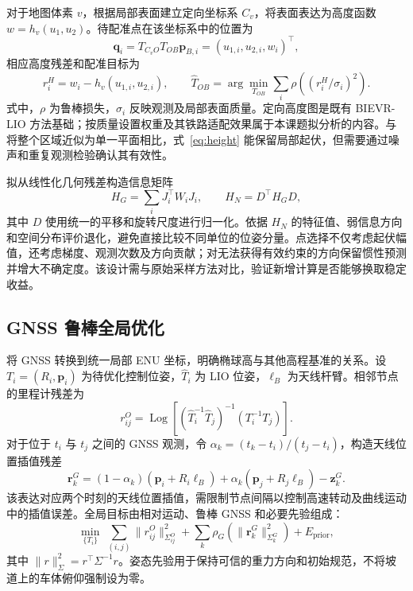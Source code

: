 \documentclass[UTF8,a4paper,12pt,fontset=fandol]{ctexart}
\newcommand{\vect}[1]{\bm{#1}}
\DeclareMathOperator{\Log}{Log}
\begin{document}
对于地图体素 \(v\)，根据局部表面建立定向坐标系 \(C_v\)，将表面表达为高度函数 \(w=h_v(u_1,u_2)\)。待配准点在该坐标系中的位置为
\begin{equation}
  \vect{q}_i=T_{C_vO}T_{OB}\vect{p}_{B,i}
  =\left(u_{1,i},u_{2,i},w_i\right)^\top ,
\end{equation}
相应高度残差和配准目标为
\begin{equation}
  r_i^H=w_i-h_v(u_{1,i},u_{2,i}),\qquad
  \widehat T_{OB}=\arg\min_{T_{OB}}
  \sum_i \rho\!\left((r_i^H/\sigma_i)^2\right).
  \label{eq:height}
\end{equation}
式中，\(\rho\) 为鲁棒损失，\(\sigma_i\) 反映观测及局部表面质量。定向高度图是既有 BIEVR-LIO 方法基础；按质量设置权重及其铁路适配效果属于本课题拟分析的内容。与将整个区域近似为单一平面相比，式~\eqref{eq:height} 能保留局部起伏，但需要通过噪声和重复观测检验确认其有效性。

拟从线性化几何残差构造信息矩阵
\begin{equation}
  H_G=\sum_i J_i^\top W_iJ_i,\qquad
  H_N=D^\top H_GD,
  \label{eq:information}
\end{equation}
其中 \(D\) 使用统一的平移和旋转尺度进行归一化。依据 \(H_N\) 的特征值、弱信息方向和空间分布评价退化，避免直接比较不同单位的位姿分量。点选择不仅考虑起伏幅值，还考虑梯度、观测次数及方向贡献；对无法获得有效约束的方向保留惯性预测并增大不确定度。该设计需与原始采样方法对比，验证新增计算是否能够换取稳定收益。

\subsection{GNSS 鲁棒全局优化}

将 GNSS 转换到统一局部 ENU 坐标，明确椭球高与其他高程基准的关系。设 \(T_i=(R_i,\vect{p}_i)\) 为待优化控制位姿，\(\widehat T_i\) 为 LIO 位姿，\(\vect{\ell}_B\) 为天线杆臂。相邻节点的里程计残差为
\begin{equation}
 r_{ij}^{O}=\Log\!\left[
  (\widehat T_i^{-1}\widehat T_j)^{-1}(T_i^{-1}T_j)
 \right].
\end{equation}
对于位于 \(t_i\) 与 \(t_j\) 之间的 GNSS 观测，令
\(\alpha_k=(t_k-t_i)/(t_j-t_i)\)，构造天线位置插值残差
\begin{equation}
 \vect{r}_k^{G}=
 (1-\alpha_k)(\vect{p}_i+R_i\vect{\ell}_B)
 +\alpha_k(\vect{p}_j+R_j\vect{\ell}_B)
 -\vect{z}_k^{G}.
 \label{eq:gnss}
\end{equation}
该表达对应两个时刻的天线位置插值，需限制节点间隔以控制高速转动及曲线运动中的插值误差。全局目标由相对运动、鲁棒 GNSS 和必要先验组成：
\begin{equation}
 \min_{\{T_i\}}\;
 \sum_{(i,j)}\|r_{ij}^{O}\|_{\Sigma_{ij}^{O}}^2
 +\sum_k\rho_G\!\left(
  \|\vect{r}_k^{G}\|_{\Sigma_k^{G}}^2\right)
 +E_{\mathrm{prior}},
 \label{eq:global}
\end{equation}
其中 \(\|r\|_{\Sigma}^{2}=r^\top\Sigma^{-1}r\)。姿态先验用于保持可信的重力方向和初始规范，不将坡道上的车体俯仰强制设为零。
\end{document}
